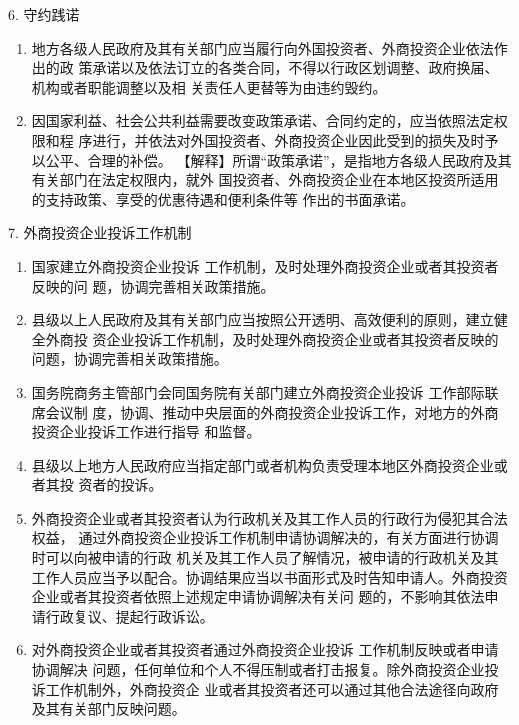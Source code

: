 \documentclass[UTF8,12pt]{ctexart}
\numberwithin{equation}{section} %
\numberwithin{figure}{section}
\numberwithin{table}{section}
\begin{document}
	6. 守约践诺
	\begin{enumerate}
		\item 地方各级人民政府及其有关部门应当履行向外国投资者、外商投资企业依法作出的政 策承诺以及依法订立的各类合同，不得以行政区划调整、政府换届、机构或者职能调整以及相 关责任人更替等为由违约毁约。
		
		\item 因国家利益、社会公共利益需要改变政策承诺、合同约定的，应当依照法定权限和程 序进行，并依法对外国投资者、外商投资企业因此受到的损失及时予以公平、合理的补偿。
		【解释】所谓“政策承诺”，是指地方各级人民政府及其有关部门在法定权限内，就外 国投资者、外商投资企业在本地区投资所适用的支持政策、享受的优惠待遇和便利条件等 作出的书面承诺。
		
	\end{enumerate}
	
	7. 外商投资企业投诉工作机制
	\begin{enumerate}
		\item 国家建立外商投资企业投诉 工作机制，及时处理外商投资企业或者其投资者反映的问 题，协调完善相关政策措施。
		
		\item 县级以上人民政府及其有关部门应当按照公开透明、高效便利的原则，建立健全外商投 资企业投诉工作机制，及时处理外商投资企业或者其投资者反映的问题，协调完善相关政策措施。 
		
		\item 国务院商务主管部门会同国务院有关部门建立外商投资企业投诉 工作部际联席会议制 度，协调、推动中央层面的外商投资企业投诉工作，对地方的外商投资企业投诉工作进行指导 和监督。
		
		\item 县级以上地方人民政府应当指定部门或者机构负责受理本地区外商投资企业或者其投 资者的投诉。
		
		\item 外商投资企业或者其投资者认为行政机关及其工作人员的行政行为侵犯其合法权益， 通过外商投资企业投诉工作机制申请协调解决的，有关方面进行协调时可以向被申请的行政 机关及其工作人员了解情况，被申请的行政机关及其工作人员应当予以配合。协调结果应当以书面形式及时告知申请人。外商投资企业或者其投资者依照上述规定申请协调解决有关问 题的，不影响其依法申请行政复议、提起行政诉讼。
		
		\item 对外商投资企业或者其投资者通过外商投资企业投诉 工作机制反映或者申请协调解决 问题，任何单位和个人不得压制或者打击报复。除外商投资企业投诉工作机制外，外商投资企 业或者其投资者还可以通过其他合法途径向政府及其有关部门反映问题。
	\end{enumerate}
	
\end{document}
